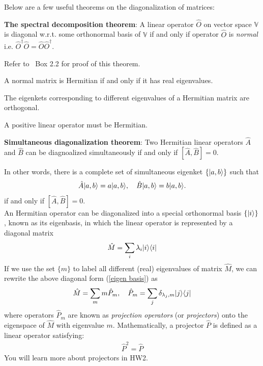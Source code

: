 Below are a few useful theorems on the diagonalization of matrices:

\begin{thm}
    \textbf{The spectral decomposition theorem}: A linear operator $\hat O$ on vector space $\mathbb{V}$ is diagonal w.r.t. some orthonormal basis of $\mathbb{V}$ if and only if operator $\hat O$ is \emph{normal} i.e. $\hat O^\dagger\hat O=\hat O\hat O^\dagger$. 
\end{thm}
Refer to \nielsen~Box 2.2 for proof of this theorem.

\begin{thm}
    A normal matrix is Hermitian if and only if it has real eigenvalues.
\end{thm}

\begin{thm}
    The eigenkets corresponding to different eigenvalues of a Hermitian matrix are orthogonal.
\end{thm}

\begin{thm}
   A positive linear operator must be Hermitian. 
\end{thm}

\begin{thm}
    \textbf{Simultaneous diagonalization theorem}: Two Hermitian linear operators $\hat A$ and $\hat B$ can be diagnoalized simultaneously if and only if $[\hat A,\hat B]=0$.
\end{thm}
 In other words, there is a complete set of simultaneous eigenket $\{|{a,b}\rangle\}$ such that
\begin{align}
\hat A|{a,b}\rangle=a|{a,b}\rangle,~~~\hat B|{a,b}\rangle=b|{a,b}\rangle.
\end{align}
if and only if $[\hat A,\hat B]=0$.\\

An Hermitian operator can be diagonalized into a special orthonormal basis $\{|{i}\rangle\}$, known as its eigenbasis, in which the linear operator is represented by a diagonal matrix
\begin{align}
\label{eigen basis}
\hat M=\sum_i\lambda_i|{i}\rangle\langle{i}|
\end{align}
If we use the set $\{m\}$ to label all different (real) eigenvalues of matrix $\hat M$, we can rewrite the above diagonal form (\ref{eigen basis}) as
\begin{align}
\hat M=\sum_m m\hat P_m,~~~\hat P_m=\sum_{j}\delta_{\lambda_j,m}|{j}\rangle\langle{j}|
\end{align}
where operators $\hat P_m$ are known as \emph{projection operators} (or \emph{projectors}) onto the eigenspace of $\hat M$ with eigenvalue $m$. Mathematically, a projector $\hat P$ is defined as a linear operator satisfying:
\begin{align}
\hat P^2=\hat P
\end{align}
You will learn more about projectors in HW2.

